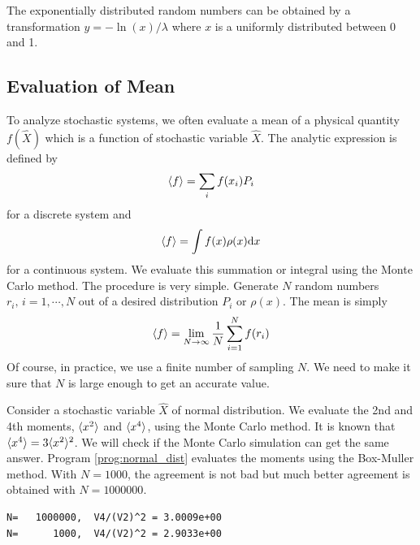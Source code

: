 The exponentially distributed random numbers can be obtained by a transformation $y=-\ln(x)/\lambda$ where $x$ is a uniformly distributed between 0 and 1.

\noindent
\subsection{Evaluation of Mean}

To analyze stochastic systems, we often evaluate a mean of a physical quantity $f(\hat{X})$ which is a function of stochastic variable $\hat{X}$.  The analytic expression is defined by 
\begin{equation}
\langle f \rangle = \sum_i f(x_i) P_i
\end{equation}
for a discrete system
and 
\begin{equation}
\langle f \rangle = \int f(x) \rho(x) \text{d} x
\end{equation}
for a continuous system.
We evaluate this summation or integral using the Monte Carlo method.  The procedure is very simple.
Generate $N$ random numbers $r_i,\, i=1,\cdots,N$ out of a desired distribution $P_i$ or $\rho(x)$.  The mean is simply
\begin{equation}
\langle f \rangle = \lim_{N \rightarrow \infty} \frac{1}{N} \sum_{i=1}^N f(r_i) 
\end{equation}
Of course, in practice, we use a finite number of sampling $N$.  We need to make it sure that $N$ is large enough to get an accurate value.

\begin{example}

Consider a stochastic variable $\hat{X}$ of normal distribution. We evaluate the 2nd and 4th moments, $\langle x^2 \rangle$ and $\langle x^4 \rangle$, using the Monte Carlo method. It is known that $\langle x^4 \rangle = 3 \langle x^2 \rangle^2$. We will check if the Monte Carlo simulation can get the same answer. Program \ref{prog:normal_dist} evaluates the moments using the Box-Muller method.   With $N=1000$, the agreement is not bad but 
much better agreement is obtained with $N=1000000$.

\begin{center}
\begin{minipage}{3.5in}
\small
\begin{Verbatim}[frame=single]
N=   1000000,  V4/(V2)^2 = 3.0009e+00
N=      1000,  V4/(V2)^2 = 2.9033e+00
\end{Verbatim}
\normalsize
\end{minipage}
\end{center}
\end{example}


